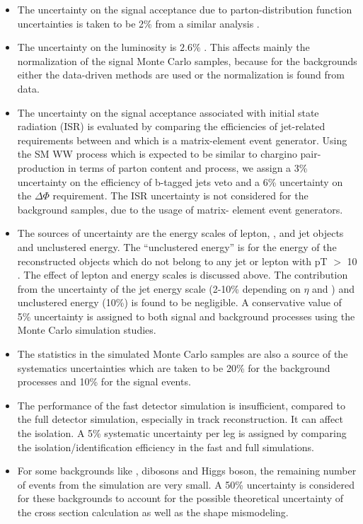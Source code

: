 \begin{itemize}
\item The uncertainty on the signal acceptance due to parton-distribution function uncertainties 
  is taken to be 2\% from a similar analysis \cite{Khachatryan:2014qwa}.

\item The uncertainty on the luminosity  is $2.6\%$ \cite{CMS-PAS-LUM-13-001}.  This affects mainly the
  normalization of the signal Monte Carlo samples, because for the backgrounds  either  the data-driven methods are used or 
the normalization is found from data.

\item The uncertainty on the signal acceptance associated with initial state radiation (ISR)
is evaluated by comparing the efficiencies of jet-related requirements between \PYTHIA
 and \MADGRAPH which is a matrix-element event generator. Using the SM WW process which
 is expected to be similar to chargino pair-production in terms of parton content and process, we assign a 3\% uncertainty on 
the efficiency of  b-tagged jets veto and a 6\% uncertainty on the $\Delta \Phi$ requirement. The ISR
 uncertainty is not considered for the background samples, due to the usage of matrix-
 element event generators.

\item The sources of \MPT uncertainty are the energy scales of lepton, \Tau, and jet
objects and unclustered energy.  The ``unclustered energy'' is for the energy of the reconstructed objects which
 do not belong to any jet or lepton with pT $>$ 10 \GeV. The effect of lepton and \Tau
 energy scales is discussed above. The contribution from the uncertainty of the jet energy scale (2-10\% depending on $\eta$  and \PT) and
 unclustered energy (10\%) is found to be negligible. A conservative value of 5\% uncertainty
 is assigned to both signal and background processes using the Monte
 Carlo simulation studies.

\item The statistics in the simulated Monte Carlo samples are also a
 source of the systematics uncertainties which are taken to be 20\% for the background processes and 10\% for the signal events.

\item The performance of the fast detector simulation is insufficient, compared to the full detector simulation, especially in
 track reconstruction. It can affect the \Tau isolation. A 5\% systematic uncertainty per
 \Tau leg is assigned by comparing the \Tau isolation/identification efficiency in the fast
 and full simulations.

\item For some backgrounds like \ttbar,  dibosons and Higgs boson, the remaining number of
events from the simulation are very small. A 50\% uncertainty is considered for these backgrounds to account for the possible theoretical uncertainty of the
cross section calculation as well as the shape mismodeling.
\end{itemize}


